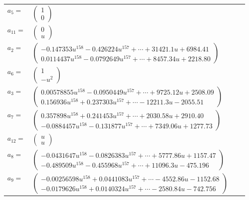 \documentclass[1p]{elsarticle_modified}
\theoremstyle{definition}
\begin{document}
\begin{tabular}{m{7pt} m{180pt} m{7pt} m{180pt} }
\flushright $a_{5}=$&$\begin{pmatrix}1\\0\end{pmatrix}$ \\
\flushright $a_{11}=$&$\begin{pmatrix}0\\u\end{pmatrix}$ \\
\flushright $a_{2}=$&$\begin{pmatrix}-0.147353 u^{158}-0.426224 u^{157}+\cdots+31421.1 u+6984.41\\0.0114437 u^{158}-0.0792649 u^{157}+\cdots+8457.34 u+2218.80\end{pmatrix}$ \\
\flushright $a_{6}=$&$\begin{pmatrix}1\\- u^2\end{pmatrix}$ \\
\flushright $a_{3}=$&$\begin{pmatrix}0.00578855 u^{158}-0.0950449 u^{157}+\cdots+9725.12 u+2508.09\\0.156936 u^{158}+0.237303 u^{157}+\cdots-12211.3 u-2055.51\end{pmatrix}$ \\
\flushright $a_{7}=$&$\begin{pmatrix}0.357898 u^{158}+0.241453 u^{157}+\cdots+2030.58 u+2910.40\\-0.0884457 u^{158}-0.131877 u^{157}+\cdots+7349.06 u+1277.73\end{pmatrix}$ \\
\flushright $a_{12}=$&$\begin{pmatrix}u\\u\end{pmatrix}$ \\
\flushright $a_{8}=$&$\begin{pmatrix}-0.0431647 u^{158}-0.0826383 u^{157}+\cdots+5777.86 u+1157.47\\-0.489509 u^{158}-0.455968 u^{157}+\cdots+11096.3 u-475.196\end{pmatrix}$ \\
\flushright $a_{9}=$&$\begin{pmatrix}-0.00256598 u^{158}+0.0441083 u^{157}+\cdots-4552.86 u-1152.68\\-0.0179626 u^{158}+0.0140324 u^{157}+\cdots-2580.84 u-742.756\end{pmatrix}$ \\

\end{tabular}
\end{document}
